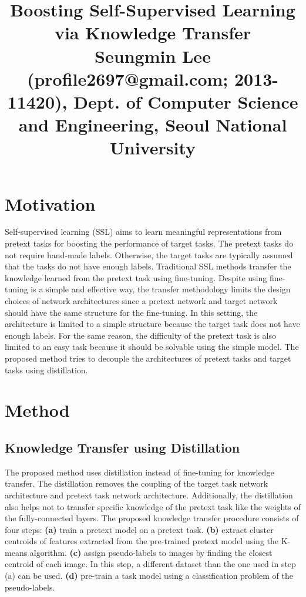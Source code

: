 \documentclass[10pt,twocolumn,letterpaper]{article}
\begin{document}
\title{Boosting Self-Supervised Learning via Knowledge Transfer
	 \\ {\rm {\normalsize Seungmin Lee (profile2697@gmail.com; 2013-11420), Dept. of Computer Science and Engineering, Seoul National University}}} 

\maketitle
\thispagestyle{empty}


\section{Motivation}
Self-supervised learning (SSL) aims to learn meaningful representations from pretext tasks for boosting the performance of target tasks. The pretext tasks do not require hand-made labels. Otherwise, the target tasks are typically assumed that the tasks do not have enough labels. Traditional SSL methods transfer the knowledge learned from the pretext task using fine-tuning. Despite using fine-tuning is a simple and effective way, the transfer methodology limits the design choices of network architectures since a pretext network and target network should have the same structure for the fine-tuning. In this setting, the architecture is limited to a simple structure because the target task does not have enough labels. For the same reason, the difficulty of the pretext task is also limited to an easy task because it should be solvable using the simple model. The proposed method tries to decouple the architectures of pretext tasks and target tasks using distillation.
 

\section{Method}
\subsection{Knowledge Transfer using Distillation}
The proposed method uses distillation instead of fine-tuning for knowledge transfer. The distillation removes the coupling of the target task network architecture and pretext task network architecture. Additionally, the distillation also helps not to transfer specific knowledge of the pretext task like the weights of the fully-connected layers. The proposed knowledge transfer procedure consists of four steps: \textbf{(a)} train a pretext model on a pretext task. \textbf{(b)} extract cluster centroids of features extracted from the pre-trained pretext model using the K-means algorithm. \textbf{(c)} assign pseudo-labels to images by finding the closest centroid of each image. In this step, a different dataset than the one used in step (a) can be used. \textbf{(d)} pre-train a task model using a classification problem of the pseudo-labels.
\end{document}
